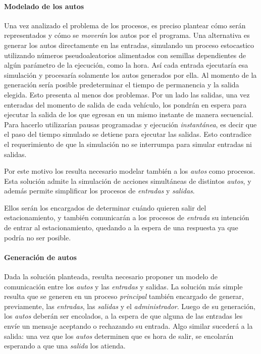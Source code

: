 \documentclass{article}
\begin{document}
        \paragraph{Modelado de los autos} Una vez analizado el
        problema de los procesos, es preciso plantear cómo serán
        representados y cómo se \emph{moverán} los autos por el
        programa. Una alternativa es generar los autos
        directamente en las entradas, simulando un proceso
        estocastico utilizando números pseudoaleatorios
        alimentados con semillas dependientes de algún parámetro
        de la ejecución, como la hora. Así cada entrada
        ejecutaría esa simulación y procesaría solamente los
        autos generados por ella. Al momento de la generación
        sería posible predeterminar el tiempo de permanencia y
        la salida elegida. Esto presenta al menos dos problemas.
        Por un lado las salidas, una vez enteradas del momento
        de salida de cada vehículo, los pondrán en espera para
        ejecutar la salida de los que egresan en un mismo
        instante de manera secuencial. Para hacerlo utilizarían
        pausas programadas y ejecución \emph{instantánea}, es
        decir que el paso del tiempo simulado se detiene para
        ejecutar las salidas. Esto contradice el requerimiento
        de que la simulación no se interrumpa para simular
        entradas ni salidas.
        
        Por este motivo los resulta necesario modelar también a
        los \emph{autos} como procesos. Esta solución admite la
        simulación de acciones simultáneas de distintos \emph{
        autos}, y además permite simplificar los procesos de
        \emph{entradas} y \emph{salidas}.
        
        Ellos serán los 
        encargados de determinar cuándo quieren salir del
        estacionamiento, y también comunicarán a los procesos de
        \emph{entrada} su intención de entrar al estacionamiento,
        quedando a la espera de una respuesta ya que podría no
        ser posible. 
        
        \paragraph{Generación de autos} Dada la solución
        planteada, resulta necesario proponer un modelo de
        comunicación entre los \emph{autos} y las \emph{entradas}
        y salidas. La solución más simple resulta que se generen
        en un proceso \emph{principal} también encargado de
        generar, previamente, las \emph{entradas}, las \emph{
        salidas} y el \emph{administrador}. Luego de su
        generación, los \emph{autos} deberán ser encolados, a
        la espera de que alguna de las entradas les envíe un
        mensaje aceptando o rechazando su entrada. Algo similar
        sucederá a la salida: una vez que los \emph{autos}
        determinen que es hora de salir, se encolarán esperando
        a que una \emph{salida} los atienda.
        
\end{document}

